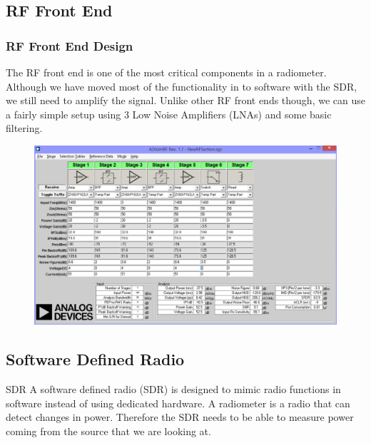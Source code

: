 \documentclass[notes]{beamer}
\begin{document}
\subsection{RF Front End}
\begin{frame}
\frametitle{RF Front End Design}

The RF front end is one of the most critical components in a radiometer.  Although we have moved most of the functionality in to software with the SDR, we still need to amplify the signal.  Unlike other RF front ends though, we can use a fairly simple setup using 3 Low Noise Amplifiers (LNAs) and some basic filtering.  


\begin{figure}\label{AD_RFSIM}
\includegraphics[width=0.6\linewidth]{images/RF_Front_end.png}
\end{figure}
\end{frame}

\subsection{Software Defined Radio}
\begin{frame}
\begin{block}{SDR}
A software defined radio (SDR) is designed to mimic radio functions in software instead of using dedicated hardware.  A radiometer is a radio that can detect changes in power.  Therefore the SDR needs to be able to measure power coming from the source that we are looking at. 
\end{block}
\end{frame}
\end{document}

